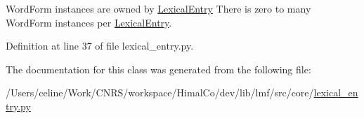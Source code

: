 Word\+Form instances are owned by \hyperlink{classlmf_1_1src_1_1core_1_1lexical__entry_1_1_lexical_entry}{Lexical\+Entry} There is zero to many Word\+Form instances per \hyperlink{classlmf_1_1src_1_1core_1_1lexical__entry_1_1_lexical_entry}{Lexical\+Entry}. 



Definition at line 37 of file lexical\+\_\+entry.\+py.



The documentation for this class was generated from the following file\+:\begin{DoxyCompactItemize}
\item 
/\+Users/celine/\+Work/\+C\+N\+R\+S/workspace/\+Himal\+Co/dev/lib/lmf/src/core/\hyperlink{lexical__entry_8py}{lexical\+\_\+entry.\+py}\end{DoxyCompactItemize}
